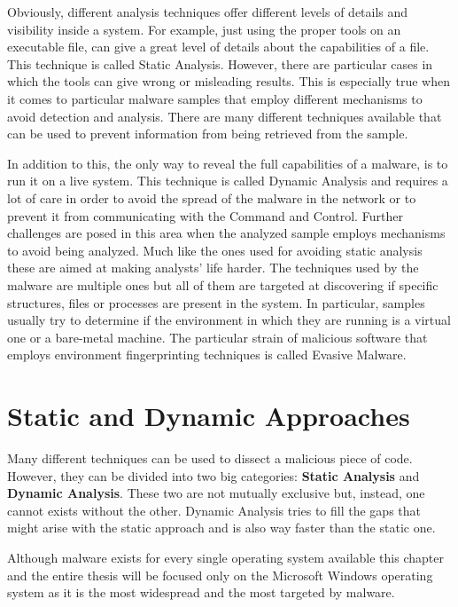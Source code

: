 Obviously, different analysis techniques offer different levels of details and visibility inside a system. For example, just using the proper tools on an executable file, can give a great level of details about the capabilities of a file. This technique is called Static Analysis. However, there are particular cases in which the tools can give wrong or misleading results. This is especially true when it comes to particular malware samples that employ different mechanisms to avoid detection and analysis. There are many different techniques available that can be used to prevent information from being retrieved from the sample.  

In addition to this, the only way to reveal the full capabilities of a malware, is to run it on a live system. This technique is called Dynamic Analysis and requires a lot of care in order to avoid the spread of the malware in the network or to prevent it from communicating with the Command and Control. Further challenges are posed in this area when the analyzed sample employs mechanisms to avoid being analyzed. Much like the ones used for avoiding static analysis these are aimed at making analysts' life harder. The techniques used by the malware are multiple ones but all of them are targeted at discovering if specific structures, files or processes are present in the system. In particular, samples usually try to determine if the environment in which they are running is a virtual one or a bare-metal machine. The particular strain of malicious software that employs environment fingerprinting techniques is called Evasive Malware. 

\section{Static and Dynamic Approaches}

Many different techniques can be used to dissect a malicious piece of code. However, they can be divided into two big categories: \textbf{Static Analysis} and \textbf{Dynamic Analysis}. These two are not mutually exclusive but, instead, one cannot exists without the other. Dynamic Analysis tries to fill the gaps that might arise with the static approach and is also way faster than the static one.

Although malware exists for every single operating system available this chapter and the entire thesis will be focused only on the Microsoft Windows operating system as it is the most widespread and the most targeted by malware. 

